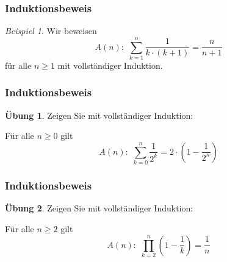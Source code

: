 \documentclass[hyperref={pdfpagelabels=false}]{beamer}
\theoremstyle{plain}%
\theoremstyle{definition}
\newtheorem*{uebung}{Übung}
\theoremstyle{remark}
\newtheorem*{beispiel}{Beispiel}
\begin{document}
\begin{frame}
\frametitle{Induktionsbeweis}

\begin{beispiel}
Wir beweisen 
	$$ A(n) : \,\, \sum\limits_{k = 1}^n \frac {1}{k \cdot (k+1)}  = \frac {n}{n+1} $$
für alle $n \geq 1$ mit vollständiger Induktion.
\end{beispiel}

\end{frame}

\begin{frame}
\frametitle{Induktionsbeweis}

\begin{uebung}
Zeigen Sie mit vollständiger Induktion: 

Für alle $n \geq 0$ gilt 
	$$ A(n): \,\, \sum\limits_{k=0}^n \frac {1}{2^k} =2 \cdot \left( 1 - \frac {1}{2^n} \right) $$
\end{uebung}

\end{frame}

\begin{frame}
\frametitle{Induktionsbeweis}

\begin{uebung}
Zeigen Sie mit vollständiger Induktion: 

Für alle $n \geq 2$ gilt 
	$$ A(n): \,\, \prod\limits_{k=2}^n \left(1 - \frac {1}{k} \right) =\frac {1}{n}$$
\end{uebung}

\end{frame}
\end{document}
